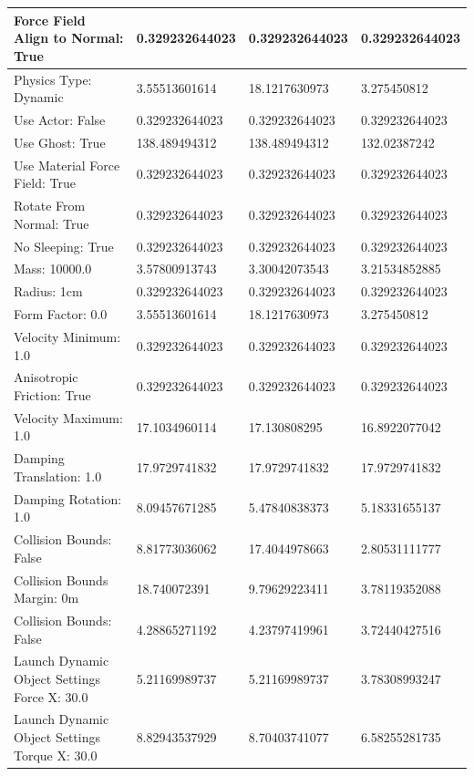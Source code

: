 \begin{table}[htbp]
\begin{tabular}{ | l || l | l | l | }
\rowcolor{lightblue}
Force Field Align to Normal: True & 0.329232644023  & 0.329232644023  & 0.329232644023 \\ \hline
Physics Type: Dynamic & 3.55513601614  & 18.1217630973  & 3.275450812 \\ \hline
\rowcolor{lightblue}
Use Actor: False & 0.329232644023  & 0.329232644023  & 0.329232644023 \\ \hline
Use Ghost: True & 138.489494312  & 138.489494312  & 132.02387242 \\ \hline
\rowcolor{lightblue}
Use Material Force Field: True & 0.329232644023  & 0.329232644023  & 0.329232644023 \\ \hline
\rowcolor{lightblue}
Rotate From Normal: True & 0.329232644023  & 0.329232644023  & 0.329232644023 \\ \hline
\rowcolor{lightblue}
No Sleeping: True & 0.329232644023  & 0.329232644023  & 0.329232644023 \\ \hline
Mass: 10000.0 & 3.57800913743  & 3.30042073543  & 3.21534852885 \\ \hline
\rowcolor{lightblue}
Radius: 1cm & 0.329232644023  & 0.329232644023  & 0.329232644023 \\ \hline
Form Factor: 0.0 & 3.55513601614  & 18.1217630973  & 3.275450812 \\ \hline
\rowcolor{lightblue}
Velocity Minimum: 1.0 & 0.329232644023  & 0.329232644023  & 0.329232644023 \\ \hline
\rowcolor{lightblue}
Anisotropic Friction: True & 0.329232644023  & 0.329232644023  & 0.329232644023 \\ \hline
Velocity Maximum: 1.0 & 17.1034960114  & 17.130808295  & 16.8922077042 \\ \hline
Damping Translation: 1.0 & 17.9729741832 & 17.9729741832 & 17.9729741832 \\ \hline
Damping Rotation: 1.0 & 8.09457671285 & 5.47840838373 & 5.18331655137 \\ \hline
Collision Bounds: False & 8.81773036062 & 17.4044978663 & 2.80531111777 \\ \hline
Collision Bounds Margin: 0m & 18.740072391  & 9.79629223411  & 3.78119352088 \\ \hline
Collision Bounds: False & 4.28865271192  & 4.23797419961  & 3.72440427516 \\ \hline
Launch Dynamic Object Settings Force X: 30.0 & 5.21169989737  & 5.21169989737  & 3.78308993247 \\ \hline
Launch Dynamic Object Settings Torque X: 30.0 & 8.82943537929  & 8.70403741077  & 6.58255281735 \\ \hline

\end{tabular}
\end{table}
